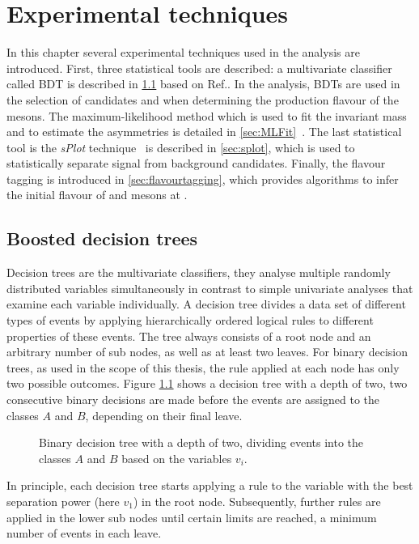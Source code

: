 \chapter{Experimental techniques}
\label{chap:tools}

\linespread{1.08}\selectfont
In this chapter several experimental techniques used in the analysis are introduced.
First, three statistical tools are described:
a multivariate classifier called \ac{BDT} is described in \cref{sec:BDT} based on Ref.\cite{Bohm:389738}.
In the analysis, \ac{BDT}s are used in the selection of \BdToDpi candidates and when determining the production flavour of the \Bz mesons.
The maximum-likelihood method which is used to fit the invariant \Bz mass and to estimate the \CP asymmetries is detailed in \cref{sec:MLFit}~\cite{Bohm:389738}.
The last statistical tool is the \emph{sPlot} technique~\cite{Pivk:2004ty} is described in \cref{sec:splot}, which is used to statistically separate signal from background candidates.
Finally, the flavour tagging is introduced in \cref{sec:flavourtagging}, which provides algorithms to infer the initial flavour of \Bz and \Bs mesons at \lhcb.

\section{Boosted decision trees}
\label{sec:BDT}

Decision trees are the multivariate classifiers, \ie they analyse multiple randomly distributed variables simultaneously in contrast to simple univariate analyses that examine each variable individually.
A decision tree divides a data set of different types of events by applying hierarchically ordered logical rules to different properties of these events.
The tree always consists of a root node and an arbitrary number of sub nodes, as well as at least two leaves.
For binary decision trees, as used in the scope of this thesis, the rule applied at each node has only two possible outcomes.
Figure \ref{fig:BDTexample} shows a decision tree with a depth of two, \ie two consecutive binary decisions are made before the events are assigned to the classes $A$ and $B$, depending on their final leave.
\begin{figure}[tbp]
    \centering
    
    \caption{Binary decision tree with a depth of two, dividing events into the classes $A$ and $B$ based on the variables $v_i$.}
    \label{fig:BDTexample}
\end{figure}
In principle, each decision tree starts applying a rule to the variable with the best separation power (here $v_1$) in the root node.
Subsequently, further rules are applied in the lower sub nodes until certain limits are reached, \eg a minimum number of events in each leave.

